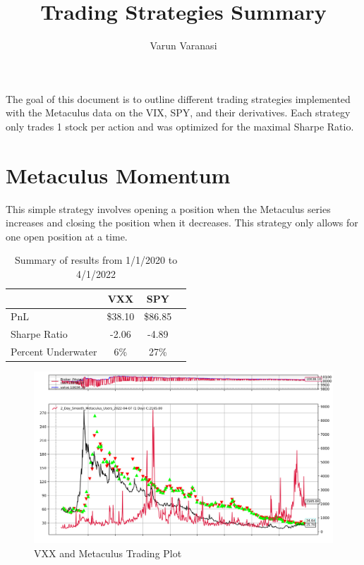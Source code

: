\documentclass{article}
\title{Trading Strategies Summary}
\author{Varun Varanasi}
\begin{document}
\maketitle

The goal of this document is to outline different trading strategies implemented with the Metaculus data on the VIX, SPY, and their derivatives. Each strategy only trades 1 stock per action and was optimized for the maximal Sharpe Ratio.

\section*{Metaculus Momentum}
This simple strategy involves opening a position when the Metaculus series increases and closing the position when it decreases. This strategy only allows for one open position at a time.

\begin{table}[h]
\centering

\begin{tabular}{l||ccc}
    \toprule
     & \textbf{VXX} & \textbf{SPY} & \\
    \midrule
    PnL & \$38.10 & \$86.85 \\
    Sharpe Ratio & -2.06 & -4.89\\
    Percent Underwater & 6\% & 27\%\\
    \bottomrule
\end{tabular}
\caption{Summary of results from 1/1/2020 to 4/1/2022}
\end{table}

\begin{figure}[H]
\centering
\includegraphics[width=\textwidth]{Metaculus_Momentum_VXX.png}
\caption{VXX and Metaculus Trading Plot}
\end{figure}
\end{document}
